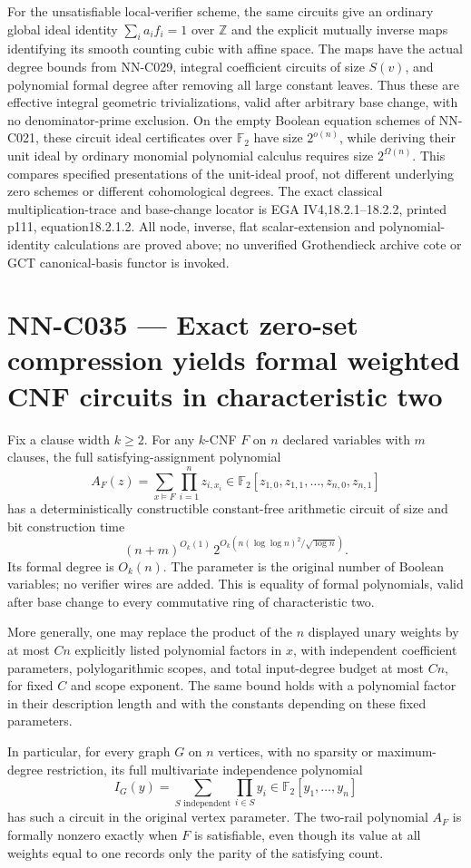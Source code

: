 For the unsatisfiable local-verifier scheme, the same circuits give an ordinary global ideal identity $\sum_i a_if_i=1$ over $\mathbb Z$ and the explicit mutually inverse maps identifying its smooth counting cubic with affine space. The maps have the actual degree bounds from NN-C029, integral coefficient circuits of size $S(v)$, and polynomial formal degree after removing all large constant leaves. Thus these are effective integral geometric trivializations, valid after arbitrary base change, with no denominator-prime exclusion. On the empty Boolean equation schemes of NN-C021, these circuit ideal certificates over $\mathbb F_2$ have size $2^{o(n)}$, while deriving their unit ideal by ordinary monomial polynomial calculus requires size $2^{\Omega(n)}$. This compares specified presentations of the unit-ideal proof, not different underlying zero schemes or different cohomological degrees. The exact classical multiplication-trace and base-change locator is EGA IV4,18.2.1--18.2.2, printed p111, equation18.2.1.2. All node, inverse, flat scalar-extension and polynomial-identity calculations are proved above; no unverified Grothendieck archive cote or GCT canonical-basis functor is invoked.



\section{NN-C035 --- Exact zero-set compression yields formal weighted CNF circuits in characteristic two}
\begin{proposition}[NN-C035]
Fix a clause width $k\ge2$. For any $k$-CNF $F$ on $n$ declared variables with $m$ clauses, the full satisfying-assignment polynomial
\[
 A_F(z)=\sum_{x\models F}\prod_{i=1}^n z_{i,x_i}
                       \in\mathbb F_2[z_{1,0},z_{1,1},\ldots,z_{n,0},z_{n,1}]
\]
has a deterministically constructible constant-free arithmetic circuit of size and bit construction time
\[
 (n+m)^{O_k(1)}\,
      2^{O_k(n(\log\log n)^2/\sqrt{\log n})}.
\]
Its formal degree is $O_k(n)$. The parameter is the original number of Boolean variables; no verifier wires are added. This is equality of formal polynomials, valid after base change to every commutative ring of characteristic two.

More generally, one may replace the product of the $n$ displayed unary weights by at most $Cn$ explicitly listed polynomial factors in $x$, with independent coefficient parameters, polylogarithmic scopes, and total input-degree budget at most $Cn$, for fixed $C$ and scope exponent. The same bound holds with a polynomial factor in their description length and with the constants depending on these fixed parameters.

In particular, for every graph $G$ on $n$ vertices, with no sparsity or maximum-degree restriction, its full multivariate independence polynomial
\[
                       I_G(y)=\sum_{S\text{ independent}}\prod_{i\in S}y_i
                                      \in\mathbb F_2[y_1,\ldots,y_n]
\]
has such a circuit in the original vertex parameter. The two-rail polynomial $A_F$ is formally nonzero exactly when $F$ is satisfiable, even though its value at all weights equal to one records only the parity of the satisfying count.
\end{proposition}
